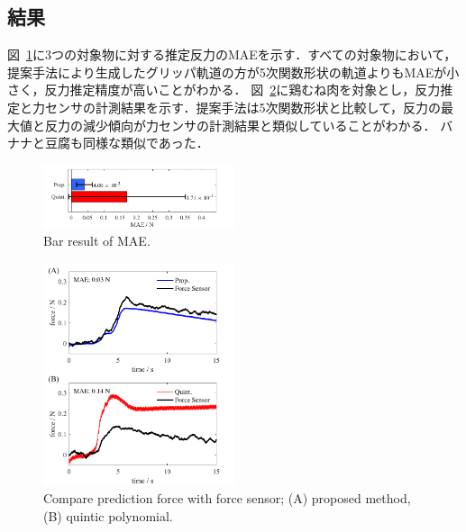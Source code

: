 \documentclass[a4paper]{jarticle}
\begin{document}
\subsection{結果}
図~\ref{fig:bar_result}に3つの対象物に対する推定反力のMAEを示す．すべての対象物において，提案手法により生成したグリッパ軌道の方が5次関数形状の軌道よりもMAEが小さく，反力推定精度が高いことがわかる．
図~\ref{fig:prop_quint}に鶏むね肉を対象とし，反力推定と力センサの計測結果を示す．提案手法は5次関数形状と比較して，反力の最大値と反力の減少傾向が力センサの計測結果と類似していることがわかる．
バナナと豆腐も同様な類似であった．
\begin{figure}[tb]
    \centering
    \includegraphics[width=0.5\textwidth]{bar_result_chiken.pdf}
    \caption{Bar result of MAE.}  
    \label{fig:bar_result}
\end{figure}
\begin{figure}[tb]
    \centering
    \includegraphics[width=0.5\textwidth]{prop_quint.pdf}
    \captionsetup{width=0.9\linewidth} %
    \caption{Compare prediction force with force sensor; (A) proposed method, (B) quintic polynomial.}
    \label{fig:prop_quint}
\end{figure}
\end{document}
